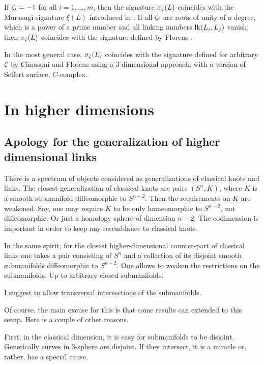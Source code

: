 \documentclass{article}
\numberwithin{equation}{section}
\begin{document}
If $\zeta_i=-1$ for all $i=1,\dots,m$, then the signature $\sigma_{\zeta}(L)$ 
coincides
with the Murasugi signature $\xi(L)$ introduced in \cite{Mura2}. 
If all $\zeta_i$ are roots of unity of a degree, which is a power of a prime
number and all linking numbers $\operatorname{lk}(L_i,L_j)$ vanish, then $\sigma_{\zeta}(L)$ 
coincides with the signature defined by
Florens \cite{Florens1}.

In the most general case, $\sigma_{\zeta}(L)$ coincides with the signature 
defined for arbitrary $\zeta$ by Cimasoni and Florens \cite{CimaFlor}
using a 3-dimensional approach, with a version of Seifert surface, 
$C$-complex.   
                           
\section{In higher dimensions}\label{s3}

\subsection{Apology for the generalization of higher dimensional 
links}\label{s3.1} 

There is a spectrum of objects
considered as generalizations of classical knots and links.
The closest generalization of classical knots
are pairs $(S^n,K)$, where $K$ is a smooth submanifold
diffeomorphic to $S^{n-2}$. Then the requirements on $K$
are weakened. Say, one may require $K$ to be only homeomorphic 
to $S^{n-2}$, not diffeomorphic. Or just a homology sphere
of dimension $n-2$. The codimension is important in order to
keep any resemblance to classical knots.

In the same spirit, for the closest higher-dimensional 
counter-part of classical links one takes a pair consisting
of $S^n$ and a collection of its disjoint smooth
submanifolds diffeomorphic to $S^{n-2}$. One allows
to weaken the restrictions on the submanifolds. Up to arbitrary
closed submanifolds. 

{\bfit I suggest to allow transversal intersections of the 
submanifolds.\/}

Of course, the main excuse for this is that 
some results  can extended to this setup. 
Here is a couple of other reasons.

First, in the classical dimension, it is easy for submanifolds to be
disjoint. Generically curves in 3-sphere are disjoint. If 
they intersect, it is a miracle or, rather, has a special
cause. 
\end{document}
